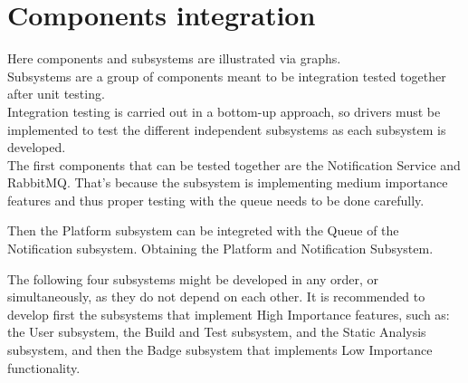 \section{Components integration}
Here components and subsystems are illustrated via graphs. \\
Subsystems are a group of components meant to be integration tested together after unit testing.\\
Integration testing is carried out in a bottom-up approach, so drivers must be implemented to test the different independent subsystems as each subsystem is developed.\\
The first components that can be tested together are the Notification Service and RabbitMQ.
That's because the subsystem is implementing medium importance features and thus proper testing with the queue needs to be done carefully.
\begin{adjustbox}{
        max size={\textwidth}{},
        center,
        caption={Notitification subsystem},
        label={fig:Notitification subsystem},
        figure=H}
\end{adjustbox}

Then the Platform subsystem can be integreted with the Queue of the Notification subsystem.
Obtaining the Platform and Notification Subsystem.
\begin{adjustbox}{
        max size={\textwidth}{},
        center,
        caption={Platform and Notification subsystem},
        label={fig:Platform and Notification subsystem},
        figure=H}
\end{adjustbox}

The following four subsystems might be developed in any order, or simultaneously, as they do not depend
on each other.
It is recommended to develop first the subsystems that implement High Importance features, such as:\\
the User subsystem, the Build and Test subsystem, and the Static Analysis subsystem, and then the Badge subsystem that implements Low Importance functionality.
\begin{adjustbox}{
        max size={\textwidth}{},
        center,
        caption={User subsystem},
        label={fig:User subsystem},
        figure=H}
\end{adjustbox}

